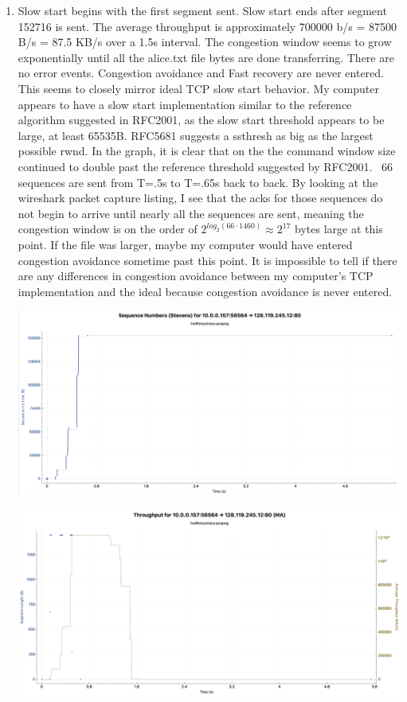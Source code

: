 \documentclass[letter,10pt]{article}
\begin{document}
\begin{enumerate}
	\item Slow start begins with the first segment sent. Slow start ends after segment 152716 is sent. The average throughput is approximately 700000 b/s = 87500 B/s = 87.5 KB/s over a 1.5s interval. The congestion window seems to grow exponentially until all the alice.txt file bytes are done transferring. There are no error events. Congestion avoidance and Fast recovery are never entered. This seems to closely mirror ideal TCP slow start behavior. My computer appears to have a slow start implementation similar to the reference algorithm suggested in RFC2001, as the slow start threshold appears to be large, at least 65535B. RFC5681 suggests a ssthresh as big as the largest possible rwnd.  In the graph, it is clear that on the the command window size continued to double past the reference threshold suggested by RFC2001. ~66 sequences are sent from T=.5s to T=.65s back to back. By looking at the wireshark packet capture listing, I see that the acks for those sequences do not begin to arrive until nearly all the sequences are sent, meaning the congestion window is on the order of $2^{log_2(66 \cdot 1460)} \approx 2^{17}$ bytes large at this point. If the file was larger, maybe my computer would have entered congestion avoidance sometime past this point. It is impossible to tell if there are any differences in congestion avoidance between my computer's TCP implementation and the ideal because congestion avoidance is never entered.
	\begin{center}
		\noindent\includegraphics[height=.5\textheight,width=.9\textwidth]{./figures/hw9p14segments}
	\end{center}
	\begin{center}
		\noindent\includegraphics[height=.5\textheight,width=.9\textwidth]{./figures/hw9p14throughput}
	\end{center}
\end{enumerate}
\end{document}
